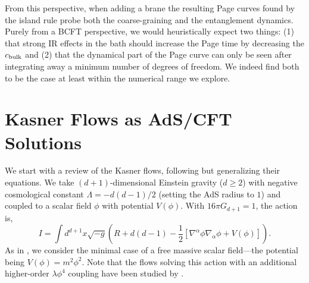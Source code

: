 \documentclass[12pt,a4paper]{article}
\begin{document}
From this perspective, when adding a brane the resulting Page curves found by the island rule probe both the coarse-graining and the entanglement dynamics. Purely from a BCFT perspective, we would heuristically expect two things: (1) that strong IR effects in the bath should increase the Page time by decreasing the $c_{\rm bulk}$ \cite{Rozali:2019day} and (2) that the dynamical part of the Page curve can only be seen after integrating away a minimum number of degrees of freedom. We indeed find both to be the case at least within the numerical range we explore.



\section{Kasner Flows as AdS/CFT Solutions}\label{sec2}

We start with a review of the Kasner flows, following \cite{Frenkel:2020ysx} but generalizing their equations. We take $(d+1)$-dimensional Einstein gravity ($d \geq 2$) with negative cosmological constant $\Lambda = -d(d-1)/2$ (setting the AdS radius to $1$) and coupled to a scalar field $\phi$ with potential $V(\phi)$. With $16\pi G_{d+1} = 1$, the action is,
\begin{equation}
I = \int d^{d+1}x \sqrt{-g}\left(R + d(d-1) - \frac{1}{2}\left[\nabla^\alpha\phi \nabla_\alpha\phi + V(\phi)\right]\right).\label{action}
\end{equation}
As in \cite{Frenkel:2020ysx}, we consider the minimal case of a free massive scalar field---the potential being $V(\phi) = m^2 \phi^2$. Note that the flows solving this action with an additional higher-order $\lambda\phi^4$ coupling have been studied by \cite{Wang:2020nkd}.
\end{document}

